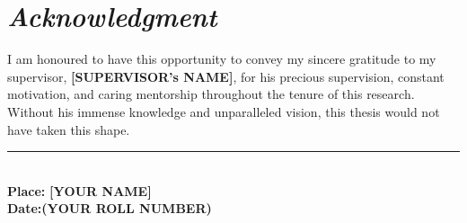 \vspace*{3em}
\section*{\centering \huge \textit{Acknowledgment}}
\vspace{3em}
I am honoured to have this opportunity to convey my sincere gratitude to my supervisor, \textbf{[SUPERVISOR's NAME]}, for his precious supervision, constant motivation, and caring mentorship throughout the tenure of this research. Without his immense knowledge and unparalleled vision, this thesis would not have taken this shape.
\vspace{5em}
\begin{flushright}
	\rule[.1em]{12em}{1pt}\\
	\textbf{Place:} \hfill \textbf{[YOUR NAME]}\\
	\textbf{Date:}\hfill \textbf{(YOUR ROLL NUMBER)}
\end{flushright}
\clearpage